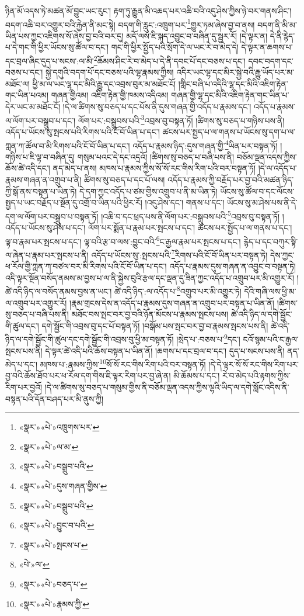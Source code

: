 ཉིན་མོ་འདས་ཏེ་མཚན་མོ་བྱུང་ཡང་རུང་། རྟག་ཏུ་རྒྱུན་མི་འཆད་པར་འཆི་བའི་འདུ་ཤེས་ཀྱིས་ཉེ་བར་གནས་ཤིང་། བདག་འཆི་བར་འགྱུར་བའི་རྐྱེན་ནི་མང་སྟེ། བདག་གི་རླུང་:འཁྲུག་པར་\footnote{«སྣར་»«པེ་»འཁྲུགས་པར་}གྱུར་ཏམ་ཞེས་བྱ་བ་ནས། བདག་ནི་མི་མ་ཡིན་པས་ཀྱང་འཇིགས་སོ་ཞེས་བྱ་བའི་བར་དུ། མདོ་ལས་ཇི་སྐད་འབྱུང་བ་བཞིན་དུ་སྦྱར་རོ། །དེ་ལྟར་ན། དེ་ནི་རྙེད་པ་དེ་གང་གི་ཕྱིར་ཡོངས་སུ་ཚོལ་བ་དང་། གང་གི་ཕྱིར་སྤྱོད་པའི་སྲོག་དེ་ལ་ཡང་རེ་བ་མེད་དེ། དེ་ལྟར་ན་ཆགས་པ་དང་བྲལ་ཞིང་དུད་པ་སངས་:ལ་མི་\footnote{«སྣར་»«པེ་»ལ་མ་}ཆོམས་ཤིང་རེ་བ་མེད་པ་དེ་ནི་དབང་པོ་དང་བཅས་པ་དང་། དབང་བདག་དང་བཅས་པ་དང་། སྐྱེ་དགུའི་བདག་པོ་དང་བཅས་པའི་ལྷ་རྣམས་ཀྱིས། འདིར་ཡང་ལྷ་དང་མིར་སྐྱེ་བའི་རྒྱུ་ཡོད་པར་མ་མཐོང་ལ། ཕྱི་མ་ལ་ཡང་ལྷ་དང་མིའི་རྒྱུ་དང་འབྲས་བུར་མ་མཐོང་ངོ། །གླིང་བཞི་པ་འདིའི་ལྷ་དང་མིའི་འཇིག་རྟེན་གང་ཡིན་པའམ། གཞན་གྱིའམ། འཇིག་རྟེན་གྱི་ཁམས་འདིའམ། གཞན་གྱི་ལྷ་དང་མིའི་འཇིག་རྟེན་གང་ཡིན་པ་དེར་ཡང་མ་མཐོང་ངོ། །དེ་ལ་ཚིགས་སུ་བཅད་པ་དང་པོས་ནི་དུས་གཞན་གྱི་འདོད་པ་རྣམས་དང་། འདོད་པ་རྣམས་ལ་ལོག་པར་བསྒྲུབ་པ་དང་། ལོག་པར་:བསྒྲུབས་པའི་\footnote{«སྣར་»«པེ་»བསྒྲུབ་པའི་}འབྲས་བུ་བསྟན་ཏོ། །ཚིགས་སུ་བཅད་པ་གཉིས་པས་ནི། འདོད་པ་ཡོངས་སུ་སྤངས་པའི་རིགས་པའི་ངོ་བོ་ཡིན་པ་དང་། ཚངས་པར་སྤྱད་པ་ལ་གནས་པ་ཡོངས་སུ་དག་པ་ལ་ཀླན་ཀ་ཚོལ་བ་མི་རིགས་པའི་ངོ་བོ་ཡིན་པ་དང་། འདོད་པ་རྣམས་ཉིད་:དུས་གཞན་གྱི་\footnote{«སྣར་»«པེ་»དུས་གཞན་གྱིས་}ཡིན་པར་བསྟན་ཏོ། །གཉིས་པ་ཇི་ལྟ་བ་བཞིན་དུ། གསུམ་པའང་དེ་དང་འདྲའོ། །ཚིགས་སུ་བཅད་པ་བཞི་པས་ནི། བཅོམ་ལྡན་འདས་ཀྱིས་ཆོས་ཚེ་འདི་དང་། ནད་མེད་པ་ནས། མཁས་པ་རྣམས་ཀྱིས་སོ་སོ་རང་གིས་རིག་པའི་བར་བསྟན་ཏོ། །དེ་ལ་འདོད་པ་རྣམས་གཞན་ན་འགྲུབ་པ་ནི། ཚིགས་སུ་བཅད་པ་དང་པོ་ལས། འདོད་པ་རྣམས་ཀྱི་བརྗོད་པར་བྱ་བའི་མཚན་ཉིད་ཀྱི་སྒོ་ནས་བསྟན་པ་ཡིན་ཏེ། དེ་དག་ཀྱང་འདོད་པ་ཙམ་གྱིས་འགྲུབ་པ་ནི་མ་ཡིན་ཏེ། ཡོངས་སུ་ཚོལ་བ་དང་ལོངས་སྤྱད་པ་ཡང་བརྗོད་པ་སྔོན་དུ་འགྲོ་བ་ཡིན་པའི་ཕྱིར་རོ། །འདུ་ཤེས་དང་། གནས་པ་དང་། ཡོངས་སུ་མ་ཤེས་པས་ནི་དེ་དག་ལ་ལོག་པར་བསྒྲུབ་པ་བསྟན་ཏོ། །འཆི་བ་དང་ཕྲད་པས་ནི་ལོག་པར་:བསྒྲུབས་པའི་\footnote{«སྣར་»«པེ་»བསྒྲུབ་པའི་}འབྲས་བུ་བསྟན་ཏོ། །འདོད་པ་ཡོངས་སུ་ཤེས་པ་དང་། ལོག་པར་སྨོན་པ་རྣམ་པར་སྤངས་པ་དང་། ཚངས་པར་སྤྱོད་པ་ལ་གནས་པ་དང་། ལྟ་བ་རྣམ་པར་སྤངས་པ་དང་། ལྟ་བའི་རྩ་བ་ལས་:བྱུང་བའི་\footnote{«སྣར་»«པེ་»བྱུང་བ་པའི་}ང་རྒྱལ་རྣམ་པར་སྤངས་པ་དང་། རྙེད་པ་དང་བཀུར་སྟི་ལ་ཞེན་པ་རྣམ་པར་སྤངས་པ་ནི། འདོད་པ་ཡོངས་སུ་:སྤངས་པའི་\footnote{«སྣར་»«པེ་»སྤངས་པ་}རིགས་པའི་ངོ་བོ་ཡིན་པར་བསྟན་ཏེ། དེས་ཀྱང་ཕ་རོལ་གྱི་ཀླན་ཀ་བཙལ་བར་མི་རིགས་པའི་ངོ་བོ་ཡིན་པ་དང་། འདོད་པ་རྣམས་དུས་གཞན་ན་འབྱུང་བ་བསྟན་ཏེ། འདི་ལྟར་སྔོན་བསོད་ནམས་མ་བྱས་པ་ལ་ནི་སྐྱེས་བུའི་རྩལ་དང་ལྡན་དུ་ཟིན་ཀྱང་འདོད་པ་འགྲུབ་པར་མི་འགྱུར་རོ། །ཚེ་འདི་ཉིད་ལ་བསོད་ནམས་བྱས་ན་ཡང་། ཚེ་འདི་ཉིད་:ལ་འདོད་པ་\footnote{«པེ་»ལ་}འགྲུབ་པར་མི་འགྱུར་ཏེ། དེའི་གཞི་ལས་ཕྱི་མ་ལ་འགྲུབ་པར་འགྱུར་རོ། །རྣམ་གྲངས་དེས་ན་འདོད་པ་རྣམས་དུས་གཞན་ན་འགྲུབ་པར་བསྟན་པ་ཡིན་ནོ། །ཚིགས་སུ་བཅད་པ་བཞི་པས་ནི། མཐོང་བས་སྤང་བར་བྱ་བའི་ཉོན་མོངས་པ་རྣམས་སྤངས་པས། ཚེ་འདི་ཉིད་ལ་དགེ་སྦྱོང་གི་ཚུལ་དང་། དགེ་སྦྱོང་གི་འབྲས་བུ་དང་པོ་བསྟན་ཏོ། །བསྒོམ་པས་སྤང་བར་བྱ་བ་རྣམས་སྤངས་པས་ནི། ཚེ་འདི་ཉིད་ལ་དགེ་སྦྱོང་གི་ཚུལ་དང་དགེ་སྦྱོང་གི་འབྲས་བུ་ཕྱི་མ་བསྟན་ཏོ། །སྲེད་པ་:བཅས་པ་\footnote{«སྣར་»«པེ་»བཅད་པ་}དང་། ངའོ་སྙམ་པའི་ང་རྒྱལ་སྤངས་པས་ནི། དེ་ལྟར་ཚེ་འདི་པའི་ཆོས་བསྟན་པ་ཡིན་ནོ། །ཆགས་པ་དང་བྲལ་བ་དང་། དུད་པ་སངས་པས་ནི། ནད་མེད་པ་དང་། མཁས་པ་:རྣམས་ཀྱིས་\footnote{«སྣར་»«པེ་»རྣམས་ཀྱི་}སོ་སོ་རང་གིས་རིག་པའི་བར་བསྟན་ཏོ། །དེ་དེ་ལྟར་སོ་སོ་རང་གིས་རིག་པར་བྱ་བའི་ཆོས་ཐོབ་པར་ཕ་རོལ་དག་གིས་ཇི་ལྟར་རིག་པར་བྱ་ཞེ་ན། མི་ཆོམས་པ་དང་། རེ་བ་མེད་པའི་རྟགས་ཀྱིས་རིག་པར་བྱའོ། །དེ་ལ་ཚིགས་སུ་བཅད་པ་གསུམ་གྱིས་ནི་བཅོམ་ལྡན་འདས་ཀྱིས་ལྷའི་ཡིད་ལ་དགེ་སློང་འདིས་ནི་བསྟན་པའི་དོན་བཤད་པར་མི་ནུས་ཀྱི། 